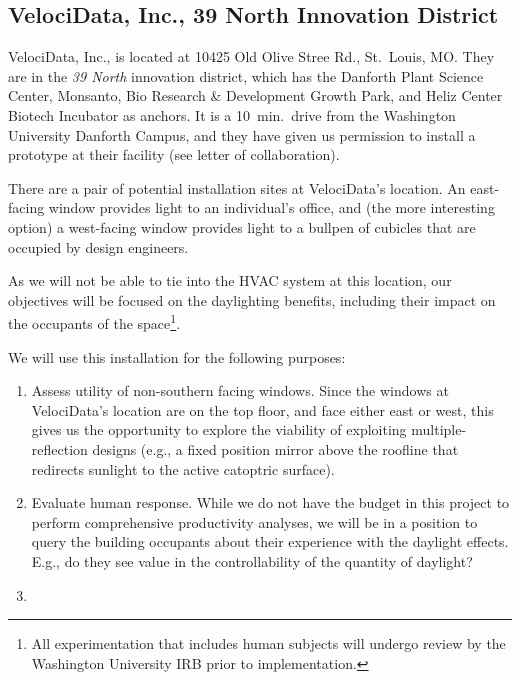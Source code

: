 \subsection{VelociData, Inc., 39 North Innovation District}

VelociData, Inc., is located at 10425 Old Olive Stree Rd., St.~Louis, MO.
They are in the \emph{39 North}
innovation district, which has the Danforth
Plant Science Center, Monsanto, Bio Research \& Development Growth Park,
and Heliz Center Biotech Incubator as anchors. It is a 10~min.~drive from
the Washington University Danforth Campus, and they have given us
permission to install a prototype at their facility (see letter
of collaboration).

There are a pair of potential installation sites at VelociData's location.
An east-facing window provides light to an individual's office, and
(the more interesting option) a west-facing window provides light to
a bullpen of cubicles that are occupied by design engineers.

As we will not be able to tie into the HVAC system at this location, our
objectives will be focused on the daylighting benefits, including their
impact on the occupants of the space\footnote{All experimentation that
includes human subjects will undergo review by the Washington University
IRB prior to implementation.}.

We will use this installation for the following purposes:

\begin{enumerate}

\item Assess utility of non-southern facing windows.
Since the windows at VelociData's location are on the top floor, and face
either east or west, this gives us the opportunity to explore the viability
of exploiting multiple-reflection designs
(e.g., a fixed position mirror above the
roofline that redirects sunlight to the active catoptric surface).

\item Evaluate human response.
While we do not have the budget in this project to perform
comprehensive productivity analyses, we will be in a position to
query the building occupants about their experience with the
daylight effects. E.g., do they see value in the controllability
of the quantity of daylight?

\item {}

\end{enumerate}

